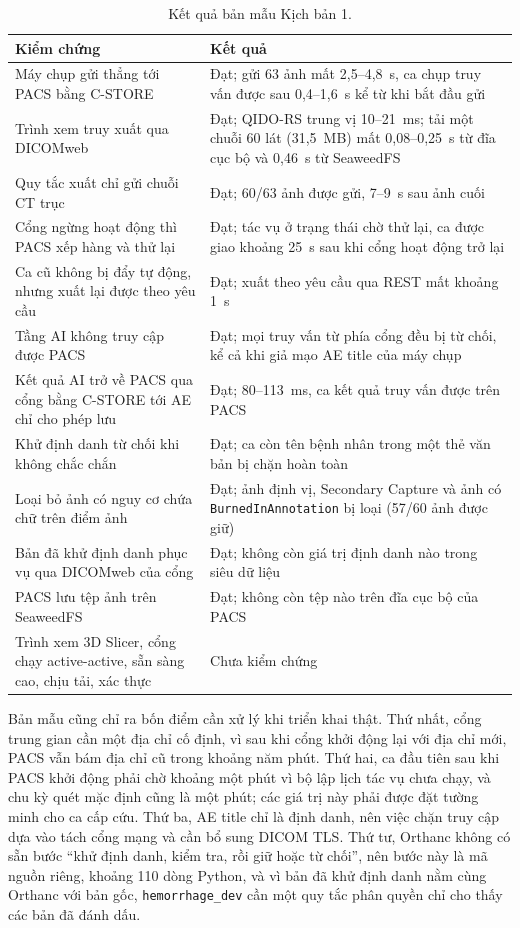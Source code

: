 \begin{table}[H]
\centering
\small
\begin{tabularx}{\textwidth}{@{}Y p{5.6cm}@{}}
\toprule
\textbf{Kiểm chứng} & \textbf{Kết quả} \\
\midrule
Máy chụp gửi thẳng tới PACS bằng C-STORE & Đạt; gửi 63 ảnh mất 2{,}5--4{,}8~s, ca chụp truy vấn được sau 0{,}4--1{,}6~s kể từ khi bắt đầu gửi \\
Trình xem truy xuất qua DICOMweb & Đạt; QIDO-RS trung vị 10--21~ms; tải một chuỗi 60 lát (31{,}5~MB) mất 0{,}08--0{,}25~s từ đĩa cục bộ và 0{,}46~s từ SeaweedFS \\
Quy tắc xuất chỉ gửi chuỗi CT trục & Đạt; 60/63 ảnh được gửi, 7--9~s sau ảnh cuối \\
Cổng ngừng hoạt động thì PACS xếp hàng và thử lại & Đạt; tác vụ ở trạng thái chờ thử lại, ca được giao khoảng 25~s sau khi cổng hoạt động trở lại \\
Ca cũ không bị đẩy tự động, nhưng xuất lại được theo yêu cầu & Đạt; xuất theo yêu cầu qua REST mất khoảng 1~s \\
Tầng AI không truy cập được PACS & Đạt; mọi truy vấn từ phía cổng đều bị từ chối, kể cả khi giả mạo AE title của máy chụp \\
Kết quả AI trở về PACS qua cổng bằng C-STORE tới AE chỉ cho phép lưu & Đạt; 80--113~ms, ca kết quả truy vấn được trên PACS \\
Khử định danh từ chối khi không chắc chắn & Đạt; ca còn tên bệnh nhân trong một thẻ văn bản bị chặn hoàn toàn \\
Loại bỏ ảnh có nguy cơ chứa chữ trên điểm ảnh & Đạt; ảnh định vị, Secondary Capture và ảnh có \texttt{BurnedInAnnotation} bị loại (57/60 ảnh được giữ) \\
Bản đã khử định danh phục vụ qua DICOMweb của cổng & Đạt; không còn giá trị định danh nào trong siêu dữ liệu \\
PACS lưu tệp ảnh trên SeaweedFS & Đạt; không còn tệp nào trên đĩa cục bộ của PACS \\
Trình xem 3D Slicer, cổng chạy active-active, sẵn sàng cao, chịu tải, xác thực & Chưa kiểm chứng \\
\bottomrule
\end{tabularx}
\caption{Kết quả bản mẫu Kịch bản 1.}
\label{tab:poc}
\end{table}

Bản mẫu cũng chỉ ra bốn điểm cần xử lý khi triển khai thật. Thứ nhất, cổng trung gian
cần một địa chỉ cố định, vì sau khi cổng khởi động lại với địa chỉ mới, PACS vẫn bám địa
chỉ cũ trong khoảng năm phút. Thứ hai, ca đầu tiên sau khi PACS khởi động phải chờ
khoảng một phút vì bộ lập lịch tác vụ chưa chạy, và chu kỳ quét mặc định cũng là một phút;
các giá trị này phải được đặt tường minh cho ca cấp cứu. Thứ ba, AE title chỉ là định
danh, nên việc chặn truy cập dựa vào tách cổng mạng và cần bổ sung DICOM TLS. Thứ tư,
Orthanc không có sẵn bước ``khử định danh, kiểm tra, rồi giữ hoặc từ chối'', nên bước này
là mã nguồn riêng, khoảng 110 dòng Python, và vì bản đã khử định danh nằm cùng Orthanc
với bản gốc, \texttt{hemorrhage\_dev} cần một quy tắc phân quyền chỉ cho thấy các bản đã đánh
dấu.

